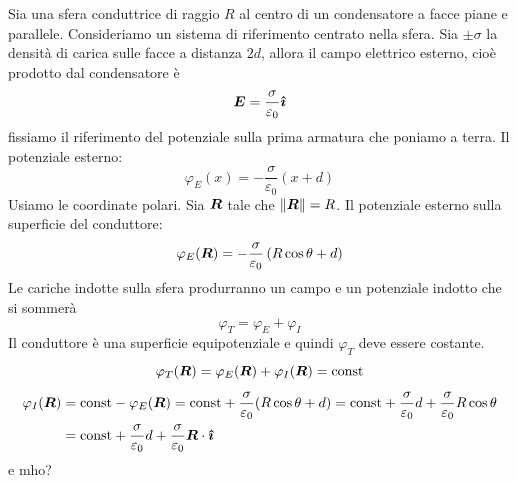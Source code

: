 \begin{Es}
Sia una sfera conduttrice di raggio $R$ al centro di un condensatore a facce piane e parallele. Consideriamo un sistema di riferimento centrato nella sfera. Sia $\pm\sigma$ la densità di carica sulle facce a distanza $2d$, allora il campo elettrico esterno, cioè prodotto dal condensatore è 
\begin{equation*}\boldsymbol{E}=\frac{\sigma}{\varepsilon_0}\boldsymbol{\hat {\imath}}\end{equation*}
fissiamo il riferimento del potenziale sulla prima armatura che poniamo a terra. Il potenziale esterno:
\begin{equation*}\varphi_{E}(x)=-\frac{\sigma}{\varepsilon_0}(x+d)\end{equation*}
Usiamo le coordinate polari. Sia $\boldsymbol{R}$ tale che $\left\lVert\boldsymbol{R}\right\rVert=R$. Il potenziale esterno sulla superficie del conduttore:
\begin{equation*}\varphi_E(\boldsymbol{R})=-\frac{\sigma}{\varepsilon_0}\left(R\cos\theta+d\right)\end{equation*}
Le cariche indotte sulla sfera produrranno un campo e un potenziale indotto che si sommerà 
\begin{equation*}\varphi_T=\varphi_E+\varphi_I\end{equation*}
Il conduttore è una superficie equipotenziale e quindi $\varphi_T$ deve essere costante.
\begin{equation*}\varphi_T(\boldsymbol{R})=\varphi_E(\boldsymbol{R})+\varphi_I(\boldsymbol{R})=\text{const}\end{equation*}
\begin{align*}
\varphi_I(\boldsymbol{R})&=\text{const}-\varphi_E(\boldsymbol{R})=\text{const}+\frac{\sigma}{\varepsilon_0}(R\cos\theta+d)=\text{const}+\frac{\sigma}{\varepsilon_0}d+\frac{\sigma}{\varepsilon_0}R\cos\theta\\
&=\text{const}+\frac{\sigma}{\varepsilon_0}d+\frac{\sigma}{\varepsilon_0}\boldsymbol{R}\cdot\boldsymbol{\hat {\imath}}
\end{align*}
e mho?
\end{Es}




